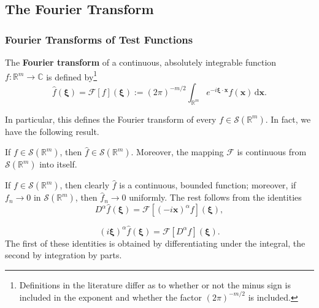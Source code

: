 \subsection{The Fourier Transform}\label{sec:fourier-transform}

\subsubsection{Fourier Transforms of Test Functions}\label{subsec:fourier-test-functions}

\begin{Definition}
\label{def:fourier-transform}
The \textbf{Fourier transform} of a continuous, absolutely integrable function $f:\mathbb{R}^m\to\mathbb{C}$ is defined by\footnote{Definitions in the literature differ as to whether or not the minus sign is included in the exponent and whether the factor $(2\pi)^{-m/2}$ is included.}
\begin{equation}\label{eq:fourier-transform-definition}
\widehat f(\bm{\xi})=\mathcal{F}[f](\bm{\xi}):=(2\pi)^{-m/2}\int_{\mathbb{R}^m}e^{-i\bm{\xi}\cdot\bm{x}}f(\bm{x})\,\mathrm{d}\bm{x}.
\end{equation}

\end{Definition}

In particular, this defines the Fourier transform of every $f\in\mathcal{S}(\mathbb{R}^m)$. In fact, we have the following result.

\begin{Theorem}
\label{thm:fourier-test-space-continuity}
If $f\in\mathcal{S}(\mathbb{R}^m)$, then $\widehat f\in\mathcal{S}(\mathbb{R}^m)$. Moreover, the mapping $\mathcal{F}$ is continuous from $\mathcal{S}(\mathbb{R}^m)$ into itself.
\end{Theorem}

\begin{Proof}
If $f\in\mathcal{S}(\mathbb{R}^m)$, then clearly $\widehat f$ is a continuous, bounded function; moreover, if $f_n\to0$ in $\mathcal{S}(\mathbb{R}^m)$, then $\widehat f_n\to0$ uniformly. The rest follows from the identities
\begin{equation}\label{eq:fourier-frequency-derivatives}
D^\alpha\widehat f(\bm{\xi})=\mathcal{F}[(-i\bm{x})^\alpha f](\bm{\xi}),
\end{equation}

\begin{equation}\label{eq:fourier-spatial-derivatives}
(i\bm{\xi})^\alpha\widehat f(\bm{\xi})=\mathcal{F}[D^\alpha f](\bm{\xi}).
\end{equation}
The first of these identities is obtained by differentiating under the integral, the second by integration by parts.
\end{Proof}

